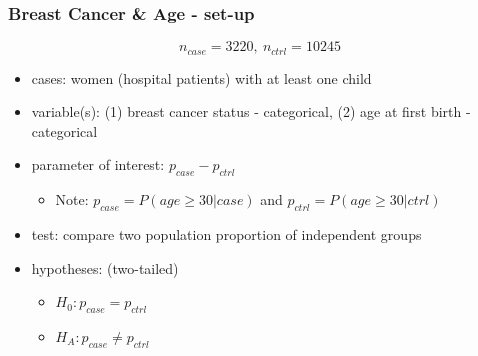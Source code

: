 \documentclass[slidestop,compress,mathserif,12pt,t,professionalfonts,xcolor=table]{beamer}
\begin{document}
\begin{frame}
\frametitle{Breast Cancer \& Age - set-up}

\vspace{-3mm}

\[ n_{case} = 3220,~n_{ctrl} = 10245 \]

\begin{itemize}
\item cases:  women (hospital patients) with at least one child
\item variable(s): \pause (1) breast cancer status - categorical, (2) age at first birth - categorical
\item parameter of interest: \pause $p_{case} - p_{ctrl}$
\begin{itemize}
\item  Note: $p_{case} = P(age \ge 30|case)$ and $p_{ctrl} = P(age \ge 30|ctrl)$
\end{itemize}
\item test: \pause compare two population proportion of independent groups
\item hypotheses: \pause (two-tailed)
\begin{itemize}
\item[] $H_0: p_{case}  =  p_{ctrl}$
\item[] $H_A: p_{case} \ne p_{ctrl}$
\end{itemize}
\end{itemize}

\end{frame}

\end{document}

